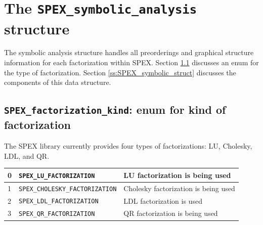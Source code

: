 \documentclass[12pt,oneside]{book}
\theoremstyle{definition}
\newenvironment{SizedCenteredTabular}[2][\small]
    {   
        #1\begin{center}\begin{tabular}{#2}
    }{ 
        \end{tabular}\end{center}
    }
\begin{document}
\section{The \texttt{SPEX\_symbolic\_analysis} structure} \label{s:spex_symbolic_analysis}
The symbolic analysis structure handles all preorderings and graphical structure information for each factorization within SPEX. Section \ref{ss:spex_factorization_kind} discusses an enum for the type of factorization. Section \ref{ss:SPEX_symbolic_struct} discusses the components of this data structure.


\subsection{\texttt{SPEX\_factorization\_kind}: enum for kind of factorization} \label{ss:spex_factorization_kind}

The SPEX library currently provides four types of factorizations: LU, Cholesky, LDL, and QR.

\begin{SizedCenteredTabular}{lll} \hline
0 & \verb|SPEX_LU_FACTORIZATION|       & LU factorization is being used \\ \hline
1 & \verb|SPEX_CHOLESKY_FACTORIZATION| & Cholesky factorization is being used\\ \hline
2 & \verb|SPEX_LDL_FACTORIZATION|      & LDL factorization is used \\ \hline
3 & \verb|SPEX_QR_FACTORIZATION|       & QR factorization is being used \\ \hline
\end{SizedCenteredTabular}


\end{document}
